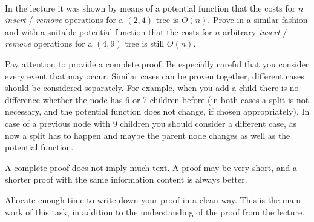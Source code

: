  \\
In the lecture it was shown by means of a potential function that the costs 
for $n$ \emph{insert} /
\emph{remove} operations for a $(2,4)$ tree is $O(n)$.
Prove in a similar fashion and with a suitable potential function that the 
costs for $n$ arbitrary \emph{insert} /
\emph{remove} operations for a $(4,9)$ tree is still $O(n)$.


Pay attention to provide a complete proof. Be especially careful that you 
consider every event that may occur. Similar cases can be proven together, 
different cases should be considered separately.
For example, when you add a child there is no difference whether the
node has 6 or 7 children before (in both cases a split is not necessary, and 
the potential function does not change, if chosen appropriately). In case of a 
previous node with 9 children you should consider a different case, as now a 
split has to happen and maybe the parent node changes as well as the potential 
function.

A complete proof does not imply much text. A proof may be very short, and a 
shorter proof with the same information content is always better.

Allocate enough time to write down your proof in a clean way. This is the main 
work of this task, in addition to the understanding of the proof from the 
lecture.
